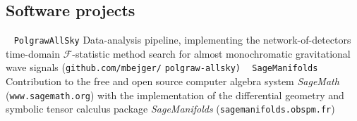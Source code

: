 \documentclass[]{friggeri-cv} %
\begin{document}
\pagebreak

\setlength{\voffset}{0pt}
\begin{aside}
\section{Software projects} 
~
{\tt PolgrawAllSky}
{Data-analysis pipeline, implementing the network-of-detectors time-domain $\mathcal{F}$-statistic method search for almost monochromatic gravitational wave signals ({\tt github.com/mbejger/}} 
{\tt polgraw-allsky)}
~
{\tt SageManifolds}
{Contribution to the free and open source computer algebra system {\it SageMath} ({\tt www.sagemath.org}) with the implementation of the differential geometry and symbolic tensor calculus package {\it SageManifolds} ({\tt sagemanifolds.obspm.fr})}
\end{aside}

%
%
%
%
%
\end{document}
